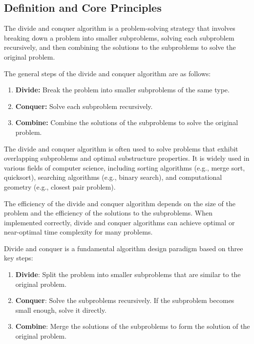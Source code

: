 \documentclass[12pt]{book} %
\begin{document}
\subsection{Definition and Core Principles}

The divide and conquer algorithm is a problem-solving strategy that involves breaking down a problem into smaller subproblems, solving each subproblem recursively, and then combining the solutions to the subproblems to solve the original problem. 

The general steps of the divide and conquer algorithm are as follows:

\begin{enumerate}
    \item \textbf{Divide:} Break the problem into smaller subproblems of the same type.
    \item \textbf{Conquer:} Solve each subproblem recursively.
    \item \textbf{Combine:} Combine the solutions of the subproblems to solve the original problem.
\end{enumerate}

The divide and conquer algorithm is often used to solve problems that exhibit overlapping subproblems and optimal substructure properties. It is widely used in various fields of computer science, including sorting algorithms (e.g., merge sort, quicksort), searching algorithms (e.g., binary search), and computational geometry (e.g., closest pair problem). 

The efficiency of the divide and conquer algorithm depends on the size of the problem and the efficiency of the solutions to the subproblems. When implemented correctly, divide and conquer algorithms can achieve optimal or near-optimal time complexity for many problems.

Divide and conquer is a fundamental algorithm design paradigm based on three key steps:
\begin{enumerate}
    \item \textbf{Divide}: Split the problem into smaller subproblems that are similar to the original problem.
    \item \textbf{Conquer}: Solve the subproblems recursively. If the subproblem becomes small enough, solve it directly.
    \item \textbf{Combine}: Merge the solutions of the subproblems to form the solution of the original problem.
\end{enumerate}
\end{document}

